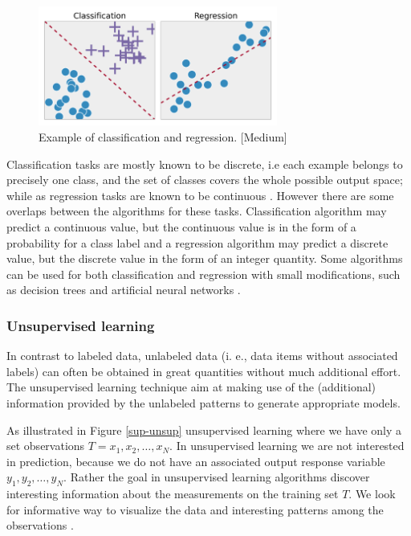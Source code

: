 \begin{figure}[H]
  \centering
    \includegraphics[width=0.7\textwidth]{images/RC.png}
    \caption{Example of classification and regression. [Medium]}
  \label{RC}
  
\end{figure}
Classification tasks are mostly known to be discrete, i.e each example belongs to precisely one class, and the set of classes covers the whole possible output space; while as regression tasks are known to be continuous \citep{stephen2009machine}. However there are some overlaps between the algorithms for these tasks. Classification algorithm may predict a continuous value, but the continuous value is in the form of a probability for a class label and a regression algorithm may predict a discrete value, but the discrete value in the form of an integer quantity. Some algorithms can be used for both classification and regression with small modifications, such as decision trees and artificial neural networks \citep{brownlee2013prepare}.  

\subsubsection{Unsupervised learning}

In contrast to labeled data, unlabeled data (i. e., data items without associated labels) can often be obtained in great quantities without much additional effort. The unsupervised learning technique aim at making use of the (additional) information provided by the unlabeled patterns to generate appropriate models. 

As illustrated in Figure \ref{sup-unsup} unsupervised learning where we have only a set observations $T=x_1,x_2,\dots, x_N$. In unsupervised learning we are not interested in prediction, because we do not have an associated output response variable $y_1,y_2,\dots, y_N$. Rather the goal in unsupervised learning algorithms discover interesting information about the measurements on the training set $T$. We look for informative way to visualize the data and interesting patterns among the observations \citep{james2013introduction}. 

